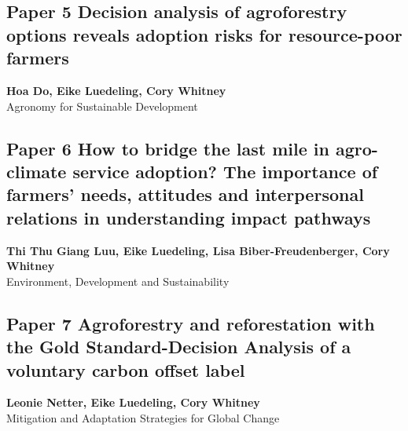 \documentclass[
]{article}
\begin{document}
\newpage

\hypertarget{do_decision_2020}{%
\subsection{Paper 5 Decision analysis of agroforestry options reveals
adoption risks for resource-poor farmers}\label{do_decision_2020}}

\begin{center}
\vspace*{2cm}
{\Large \textbf{Hoa Do, Eike Luedeling, Cory Whitney}} \\[0.5cm]
\vspace*{1cm}
{\Large Agronomy for Sustainable Development} \\[2cm]
\end{center}


\newpage

\hypertarget{luu_how_2024}{%
\subsection{Paper 6 How to bridge the last mile in agro-climate service
adoption? The importance of farmers' needs, attitudes and interpersonal
relations in understanding impact pathways}\label{luu_how_2024}}

\begin{center}
\vspace*{2cm}
{\Large \textbf{Thi Thu Giang Luu, Eike Luedeling, Lisa Biber-Freudenberger, Cory Whitney}} \\[0.5cm]
\vspace*{1cm}
{\Large Environment, Development and Sustainability} \\[2cm]
\end{center}


\newpage

\hypertarget{netter_agroforestry_2022}{%
\subsection{Paper 7 Agroforestry and reforestation with the Gold
Standard-Decision Analysis of a voluntary carbon offset
label}\label{netter_agroforestry_2022}}

\begin{center}
\vspace*{2cm}
{\Large \textbf{Leonie Netter, Eike Luedeling, Cory Whitney}} \\[0.5cm]
\vspace*{1cm}
{\Large Mitigation and Adaptation Strategies for Global Change} \\[2cm]
\end{center}

\end{document}
